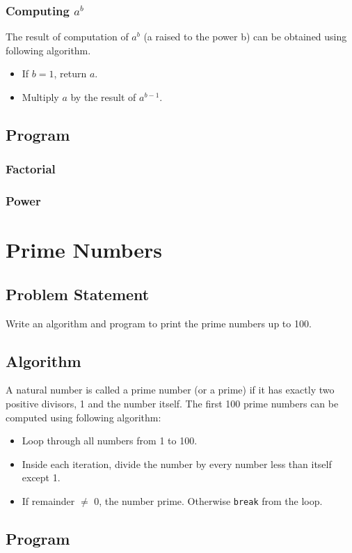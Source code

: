 \documentclass[11pt]{report}
\begin{document}
\subsection{Computing $a^b$}
The result of computation of $a^b$ (a raised to the power b) can be obtained using following algorithm.
\begin{itemize}
\item If $b = 1$, return $a$.
\item Multiply $a$ by the result of $a^{b-1}$.
\end{itemize}
\section{Program}
    \subsection{Factorial}
        
    \subsection{Power}
        

        
\chapter{Prime Numbers}
\section{Problem Statement}
Write an algorithm and program to print the prime numbers up to 100.
\section{Algorithm}
A natural number is called a prime number (or a prime) if it has exactly two positive divisors, 1 and the number itself. The first 100 prime numbers can be computed using following algorithm:
\begin{itemize}
\item Loop through all numbers from 1 to 100.
\item Inside each iteration, divide the number by every number less than itself except 1.
\item If remainder $\neq$ 0, the number prime. Otherwise \texttt{break} from the loop.
\end{itemize}
\section{Program}

\end{document}
